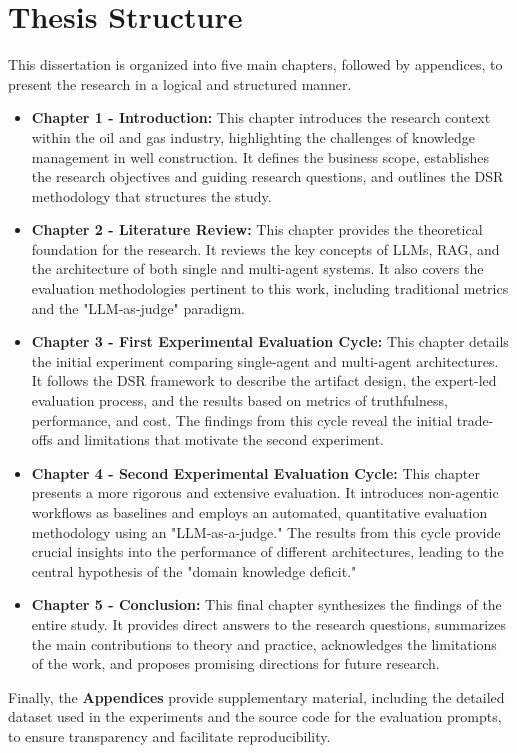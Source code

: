 \section{Thesis Structure}

    This dissertation is organized into five main chapters, followed by appendices, to present the research in a logical and structured manner.

    \begin{itemize}
        \item \textbf{Chapter 1 - Introduction:} This chapter introduces the research context within the oil and gas industry, highlighting the challenges of knowledge management in well construction. It defines the business scope, establishes the research objectives and guiding research questions, and outlines the DSR methodology that structures the study.

        \item \textbf{Chapter 2 - Literature Review:} This chapter provides the theoretical foundation for the research. It reviews the key concepts of LLMs, RAG, and the architecture of both single and multi-agent systems. It also covers the evaluation methodologies pertinent to this work, including traditional metrics and the "LLM-as-judge" paradigm.

        \item \textbf{Chapter 3 - First Experimental Evaluation Cycle:} This chapter details the initial experiment comparing single-agent and multi-agent architectures. It follows the DSR framework to describe the artifact design, the expert-led evaluation process, and the results based on metrics of truthfulness, performance, and cost. The findings from this cycle reveal the initial trade-offs and limitations that motivate the second experiment.

        \item \textbf{Chapter 4 - Second Experimental Evaluation Cycle:} This chapter presents a more rigorous and extensive evaluation. It introduces non-agentic workflows as baselines and employs an automated, quantitative evaluation methodology using an "LLM-as-a-judge." The results from this cycle provide crucial insights into the performance of different architectures, leading to the central hypothesis of the "domain knowledge deficit."

        \item \textbf{Chapter 5 - Conclusion:} This final chapter synthesizes the findings of the entire study. It provides direct answers to the research questions, summarizes the main contributions to theory and practice, acknowledges the limitations of the work, and proposes promising directions for future research.
    \end{itemize}

    Finally, the \textbf{Appendices} provide supplementary material, including the detailed dataset used in the experiments and the source code for the evaluation prompts, to ensure transparency and facilitate reproducibility.
